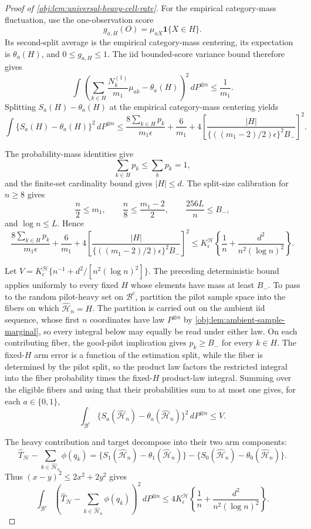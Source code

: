 \documentclass[11pt]{article}
\begin{document}
\begin{proof}[Proof of \cref{obj:lem:universal-heavy-cell-rate}]
For the empirical category-mass fluctuation, use the one-observation score
\[
g_{a,H}(O)=\mu_{aX}\mathbf 1\{X\in H\}.
\]
Its second-split average is the empirical category-mass centering, its expectation is
\(\theta_a(H)\), and \(0\le g_{a,H}\le1\). The iid bounded-score variance bound therefore gives
\[
\int
\left(
\sum_{k\in H}\frac{N_k^{(1)}}{m_1}\mu_{ak}-\theta_a(H)
\right)^2
\,dP^{\otimes n}
\le \frac1{m_1}.
\] %
Splitting \(S_a(H)-\theta_a(H)\) at the empirical category-mass centering yields
\[
\int \{S_a(H)-\theta_a(H)\}^2\,dP^{\otimes n}
\le
\frac{8\sum_{k\in H}p_k}{m_1\epsilon}
+
\frac6{m_1}
+
4\left[
\frac{|H|}
{\{((m_1-2)/2)\epsilon\}^2 B_-}
\right]^2 .
\] %

The probability-mass identities give
\[
\sum_{k\in H}p_k\le\sum_k p_k=1,
\]
and the finite-set cardinality bound gives \(|H|\le d\). The split-size calibration for
\(n\ge8\) gives
\[
\frac n2\le m_1,
\qquad
\frac n8\le\frac{m_1-2}{2},
\qquad
\frac{256L}{n}\le B_-,
\]
and \(\log n\le L\). Hence
\[
\frac{8\sum_{k\in H}p_k}{m_1\epsilon}
+
\frac6{m_1}
+
4\left[
\frac{|H|}
{\{((m_1-2)/2)\epsilon\}^2 B_-}
\right]^2
\le
K^{\mathcal H}_\epsilon
\left\{
\frac1n+\frac{d^2}{n^2(\log n)^2}
\right\}.
\] %

Let \(V=K^{\mathcal H}_\epsilon\{n^{-1}+d^2/[n^2(\log n)^2]\}\). The preceding deterministic bound applies
uniformly to every fixed \(H\) whose elements have mass at least \(B_-\). To pass to the random
pilot-heavy set on \(\mathcal B^c\), partition the pilot sample space into the fibers on which
\(\widehat{\mathcal H}_n=H\). The partition is carried out on the ambient iid sequence, whose
first \(n\) coordinates have law \(P^{\otimes n}\) by \cref{obj:lem:ambient-sample-marginal}, so
every integral below may equally be read under either law. On each contributing fiber, the
good-pilot implication gives
\(p_k\ge B_-\) for every \(k\in H\). The fixed-\(H\) arm error is a function of the estimation
split, while the fiber is determined by the pilot split, so the product law factors the restricted
integral into the fiber probability times the fixed-\(H\) product-law integral. Summing over the
eligible fibers and using that their probabilities sum to at most one gives, for each
\(a\in\{0,1\}\),
\[
\int_{\mathcal B^c}
\{S_a(\widehat{\mathcal H}_n)-\theta_a(\widehat{\mathcal H}_n)\}^2
\,dP^{\otimes n}
\le V.
\] %

The heavy contribution and target decompose into their two arm components:
\[
\widehat T_{\mathcal H}
-
\sum_{k\in\widehat{\mathcal H}_n}\phi(q_k)
=
\{S_1(\widehat{\mathcal H}_n)-\theta_1(\widehat{\mathcal H}_n)\}
-
\{S_0(\widehat{\mathcal H}_n)-\theta_0(\widehat{\mathcal H}_n)\}.
\] %
Thus \((x-y)^2\le2x^2+2y^2\) gives
\[
\int_{\mathcal B^c}
\left(
\widehat T_{\mathcal H}
-
\sum_{k\in\widehat{\mathcal H}_n}\phi(q_k)
\right)^2
\,dP^{\otimes n}
\le
4K^{\mathcal H}_\epsilon
\left\{
\frac1n+\frac{d^2}{n^2(\log n)^2}
\right\}.
\] %


\end{proof}
\end{document}
